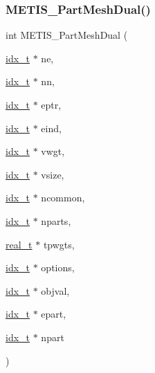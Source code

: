 \subsubsection{\texorpdfstring{M\+E\+T\+I\+S\+\_\+\+Part\+Mesh\+Dual()}{METIS\_PartMeshDual()}}
{\footnotesize\ttfamily int M\+E\+T\+I\+S\+\_\+\+Part\+Mesh\+Dual (\begin{DoxyParamCaption}\item[{\hyperlink{a00876_aaa5262be3e700770163401acb0150f52}{idx\+\_\+t} $\ast$}]{ne,  }\item[{\hyperlink{a00876_aaa5262be3e700770163401acb0150f52}{idx\+\_\+t} $\ast$}]{nn,  }\item[{\hyperlink{a00876_aaa5262be3e700770163401acb0150f52}{idx\+\_\+t} $\ast$}]{eptr,  }\item[{\hyperlink{a00876_aaa5262be3e700770163401acb0150f52}{idx\+\_\+t} $\ast$}]{eind,  }\item[{\hyperlink{a00876_aaa5262be3e700770163401acb0150f52}{idx\+\_\+t} $\ast$}]{vwgt,  }\item[{\hyperlink{a00876_aaa5262be3e700770163401acb0150f52}{idx\+\_\+t} $\ast$}]{vsize,  }\item[{\hyperlink{a00876_aaa5262be3e700770163401acb0150f52}{idx\+\_\+t} $\ast$}]{ncommon,  }\item[{\hyperlink{a00876_aaa5262be3e700770163401acb0150f52}{idx\+\_\+t} $\ast$}]{nparts,  }\item[{\hyperlink{a00876_a1924a4f6907cc3833213aba1f07fcbe9}{real\+\_\+t} $\ast$}]{tpwgts,  }\item[{\hyperlink{a00876_aaa5262be3e700770163401acb0150f52}{idx\+\_\+t} $\ast$}]{options,  }\item[{\hyperlink{a00876_aaa5262be3e700770163401acb0150f52}{idx\+\_\+t} $\ast$}]{objval,  }\item[{\hyperlink{a00876_aaa5262be3e700770163401acb0150f52}{idx\+\_\+t} $\ast$}]{epart,  }\item[{\hyperlink{a00876_aaa5262be3e700770163401acb0150f52}{idx\+\_\+t} $\ast$}]{npart }\end{DoxyParamCaption})}

